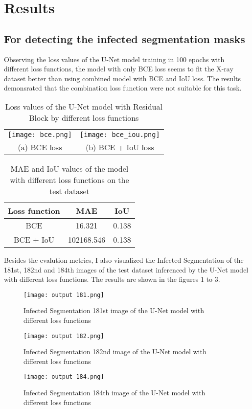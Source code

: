 \documentclass{article}
\begin{document}
\section{Results}
\subsection{For detecting the infected segmentation masks}
Observing the loss values of the U-Net model training in 100 epochs with different loss functions, the model 
with only BCE loss seems to fit the X-ray dataset better than using combined model with BCE and IoU loss.
The results demonsrated that the combination loss function were not suitable for this task.
\begin{table}[h]
    \centering
    \begin{tabular}{cc}
        \texttt{[image: bce.png]} & 
        \texttt{[image: bce\_iou.png]} \\
        (a) BCE loss & (b) BCE + IoU loss
    \end{tabular}
    \caption{Loss values of the U-Net model with Residual Block by different loss functions}
\end{table}

\begin{table}[h]
    \centering
    \begin{tabular}{|c|c|c|}
        \hline
        Loss function & MAE & IoU \\
        \hline
        BCE & 16.321 & 0.138 \\
        BCE + IoU & 102168.546 & 0.138 \\
        \hline
    \end{tabular}
    \caption{MAE and IoU values of the model with different loss functions on the test dataset}
\end{table}


Besides the evalution metrics, I also visualized the Infected Segmentation of the 181st, 182nd and 184th images of the test dataset
inferenced by the U-Net model with different loss functions. The results are shown in the figures 1 to 3.

\begin{figure}[h]
    \centering
    \texttt{[image: output 181.png]}
    \caption{Infected Segmentation 181st image of the U-Net model with different loss functions}
\end{figure}

\begin{figure}[h]
    \centering
    \texttt{[image: output 182.png]}
    \caption{Infected Segmentation 182nd image of the U-Net model with different loss functions}
\end{figure}

\begin{figure}[h]
    \centering
    \texttt{[image: output 184.png]}
    \caption{Infected Segmentation 184th image of the U-Net model with different loss functions}
\end{figure}
\end{document}
